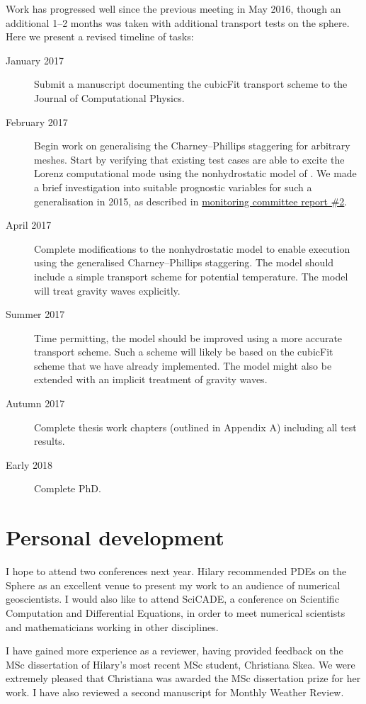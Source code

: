 \documentclass[a4paper,11pt]{article}
\begin{document}
Work has progressed well since the previous meeting in May 2016, though an additional 1--2 months was taken with additional transport tests on the sphere.  Here we present a revised timeline of tasks:
\begin{description}
\item[January 2017]{Submit a manuscript documenting the cubicFit transport scheme to the Journal of Computational Physics.}
\item[February 2017]{Begin work on generalising the Charney--Phillips staggering for arbitrary meshes.
Start by verifying that existing test cases \citep[such as][]{arakawa-konor1996} are able to excite the Lorenz computational mode using the nonhydrostatic model of \citet{weller-shahrokhi2014}.
We made a brief investigation into suitable prognostic variables for such a generalisation in 2015, as described in \href{http://www.datumedge.co.uk/publications/mc-report-2015-12.pdf}{monitoring committee report \#2}.}
\item[April 2017]{Complete modifications to the nonhydrostatic model to enable execution using the generalised Charney--Phillips staggering.  The model should include a simple transport scheme for potential temperature.  The model will treat gravity waves explicitly.}
\item[Summer 2017]{Time permitting, the model should be improved using a more accurate transport scheme.  Such a scheme will likely be based on the cubicFit scheme that we have already implemented.  The model might also be extended with an implicit treatment of gravity waves.}
\item[Autumn 2017]{Complete thesis work chapters (outlined in Appendix A) including all test results.}
\item[Early 2018]{Complete PhD.}
\end{description}

\section{Personal development}
I hope to attend two conferences next year.  Hilary recommended PDEs on the Sphere as an excellent venue to present my work to an audience of numerical geoscientists.  I would also like to attend SciCADE, a conference on Scientific Computation and Differential Equations, in order to meet numerical scientists and mathematicians working in other disciplines.

I have gained more experience as a reviewer, having provided feedback on the MSc dissertation of Hilary's most recent MSc student, Christiana Skea.  We were extremely pleased that Christiana was awarded the MSc dissertation prize for her work.  I have also reviewed a second manuscript for Monthly Weather Review.
\end{document}
